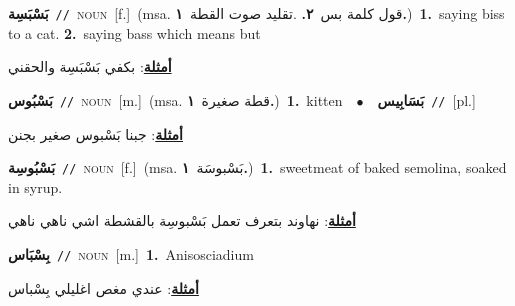 \documentclass[10pt,a4paper,twoside]{article} %
\begin{document}
\begin{multicols}{2}
{\setlength\topsep{0pt}\textbf{\foreignlanguage{arabic}{بَسْبَسِة}}\ {\color{gray}\texttt{//}\color{black}}\ \textsc{noun}\ [f.]\ \color{gray}(msa. \foreignlanguage{arabic}{قول كلمة بس}~\foreignlanguage{arabic}{\textbf{٢.}}  .\foreignlanguage{arabic}{تقليد صوت القطة}~\foreignlanguage{arabic}{\textbf{١.}})\color{black}\ \textbf{1.}~saying biss to a cat.  \textbf{2.}~saying bass which means but\  \begin{flushright}\color{gray}\foreignlanguage{arabic}{\textbf{\underline{\foreignlanguage{arabic}{أمثلة}}}: بكفي بَسْبَسِة والحقني}\end{flushright}\color{black}} \vspace{2mm}

{\setlength\topsep{0pt}\textbf{\foreignlanguage{arabic}{بَسْبُوس}}\ {\color{gray}\texttt{//}\color{black}}\ \textsc{noun}\ [m.]\ \color{gray}(msa. \foreignlanguage{arabic}{قطة صغيرة}~\foreignlanguage{arabic}{\textbf{١.}})\color{black}\ \textbf{1.}~kitten\ \ $\bullet$\ \ \setlength\topsep{0pt}\textbf{\foreignlanguage{arabic}{بَسَابِيس}}\ {\color{gray}\texttt{//}\color{black}}\ [pl.]\  \begin{flushright}\color{gray}\foreignlanguage{arabic}{\textbf{\underline{\foreignlanguage{arabic}{أمثلة}}}: جبنا بَسْبوس صغير بجنن}\end{flushright}\color{black}} \vspace{2mm}

{\setlength\topsep{0pt}\textbf{\foreignlanguage{arabic}{بَسْبُوسِة}}\ {\color{gray}\texttt{//}\color{black}}\ \textsc{noun}\ [f.]\ \color{gray}(msa. \foreignlanguage{arabic}{بَسْبوسَة}~\foreignlanguage{arabic}{\textbf{١.}})\color{black}\ \textbf{1.}~sweetmeat of baked semolina, soaked in syrup.\  \begin{flushright}\color{gray}\foreignlanguage{arabic}{\textbf{\underline{\foreignlanguage{arabic}{أمثلة}}}: نهاوند بتعرف تعمل بَسْبوسِة بالقشطة اشي ناهي ناهي}\end{flushright}\color{black}} \vspace{2mm}

{\setlength\topsep{0pt}\textbf{\foreignlanguage{arabic}{بِسْبَاس}}\ {\color{gray}\texttt{//}\color{black}}\ \textsc{noun}\ [m.]\ \textbf{1.}~Anisosciadium\  \begin{flushright}\color{gray}\foreignlanguage{arabic}{\textbf{\underline{\foreignlanguage{arabic}{أمثلة}}}: عندي مغص اغليلي بِسْباس}\end{flushright}\color{black}} \vspace{2mm}


\end{multicols}
\end{document}
